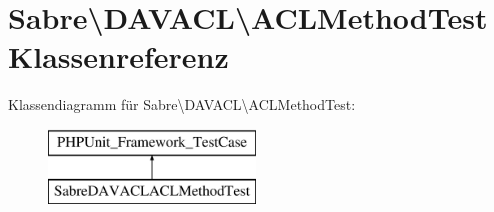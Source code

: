 \hypertarget{class_sabre_1_1_d_a_v_a_c_l_1_1_a_c_l_method_test}{}\section{Sabre\textbackslash{}D\+A\+V\+A\+CL\textbackslash{}A\+C\+L\+Method\+Test Klassenreferenz}
\label{class_sabre_1_1_d_a_v_a_c_l_1_1_a_c_l_method_test}
Klassendiagramm für Sabre\textbackslash{}D\+A\+V\+A\+CL\textbackslash{}A\+C\+L\+Method\+Test\+:\begin{figure}[H]
\begin{center}
\leavevmode
\includegraphics[height=2.000000cm]{class_sabre_1_1_d_a_v_a_c_l_1_1_a_c_l_method_test}
\end{center}
\end{figure}

